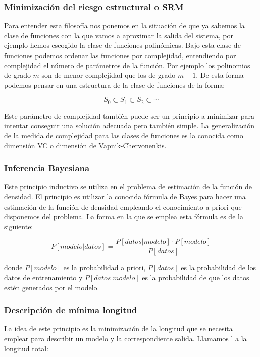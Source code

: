 \subsubsection{Minimización del riesgo estructural o SRM}

Para entender esta filosofía nos ponemos en la situación de que ya sabemos la clase de funciones con la que vamos a aproximar la salida del sistema, por ejemplo hemos escogido la clase de funciones polinómicas. Bajo esta clase de funciones podemos ordenar las funciones por complejidad, entendiendo por complejidad el número de parámetros de la función. Por ejemplo los polinomios de grado $m$ son de menor complejidad que los de grado $m+1$. De esta forma podemos pensar en una estructura de la clase de funciones de la forma:

$$S_0 \subset S_1 \subset S_2 \subset \cdots$$

Este parámetro de complejidad también puede ser un principio a minimizar para intentar conseguir una solución adecuada pero también simple. La generalización de la medida de complejidad para las clases de funciones es la conocida como dimensión VC o dimensión de Vapnik-Chervonenkis.

\subsubsection{Inferencia Bayesiana}

Este principio inductivo se utiliza en el problema de estimación de la función de densidad. El principio es utilizar la conocida fórmula de Bayes para hacer una estimación de la función de densidad empleando el conocimiento a priori que disponemos del problema. La forma en la que se emplea esta fórmula es de la siguiente:

$$P[modelo | datos] = \frac{P[datos | modelo] \cdot P[modelo]}{P[datos]}$$

donde $P[modelo]$ es la probabilidad a priori, $P[datos]$ es la probabilidad de los datos de entrenamiento y $P[datos | modelo]$ es la probabilidad de que los datos estén generados por el modelo.

\subsubsection{Descripción de mínima longitud}

La idea de este principio es la minimización de la longitud que se necesita emplear para describir un modelo y la correspondiente salida. Llamamos l a la longitud total:

